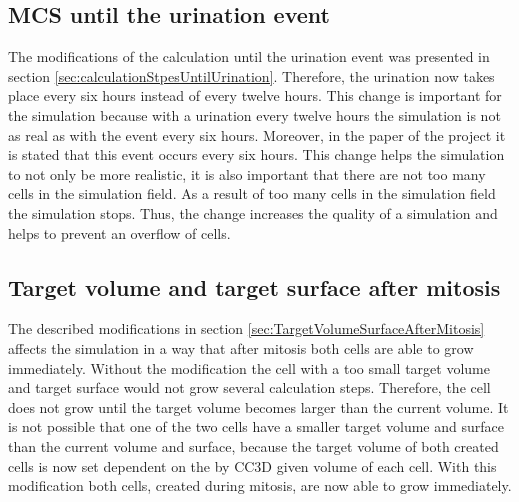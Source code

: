 \subsection{\ac{MCS} until the urination event}
The modifications of the calculation until the urination event was presented in section \ref{sec:calculationStpesUntilUrination}. Therefore, the urination now takes place every six hours instead of every twelve hours. This change is important for the simulation because with a urination every twelve hours the simulation is not as real as with the event every six hours. Moreover, in the paper \cite{Torelli2017} of the project it is stated that this event occurs every six hours. This change helps the simulation to not only be more realistic, it is also important that there are not too many cells in the simulation field. As a result of too many cells in the simulation field the simulation stops. Thus, the change increases the quality of a simulation and helps to prevent an overflow of cells.
\subsection{Target volume and target surface after mitosis}
The described modifications in section \ref{sec:TargetVolumeSurfaceAfterMitosis} affects the simulation in a way that after mitosis both cells are able to grow immediately. Without the modification the cell with a too small target volume and target surface would not grow several calculation steps. Therefore, the cell does not grow until the target volume becomes larger than the current volume. It is not possible that one of the two cells have a smaller target volume and surface than the current volume and surface, because the target volume of both created cells is now set dependent on the by \ac{CC3D} given volume of each cell. With this modification both cells, created during mitosis, are now able to grow immediately.
